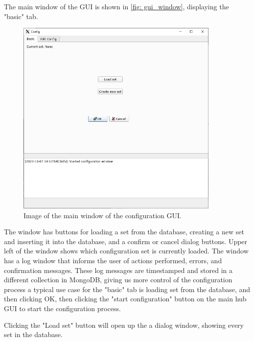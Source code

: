 \documentclass[main.tex]{subfiles}
\begin{document}
The main window of the GUI is shown in \autoref{fig: gui_window}, displaying the "basic" tab.

\begin{figure}[!ht]
    \centering
    \includegraphics[width=10cm, scale=1.5]{images/gui_main.png}
    \caption{Image of the main window of the configuration GUI.}
    \label{fig: gui_window}
\end{figure}
\FloatBarrier

The window has buttons for loading a set from the database, creating a new set and inserting it into the database, and a confirm or cancel dialog buttons. Upper left of the window shows which configuration set is currently loaded. The window has a log window that informs the user of actions performed, errors, and confirmation messages. These log messages are timestamped and stored in a different collection in MongoDB, giving us more control of the configuration process a typical use case for the "basic" tab is loading set from the database, and then clicking OK, then clicking the "start configuration" button on the main hub GUI to start the configuration process.

Clicking the "Load set" button will open up the a dialog window, showing every set in the database.
\end{document}
